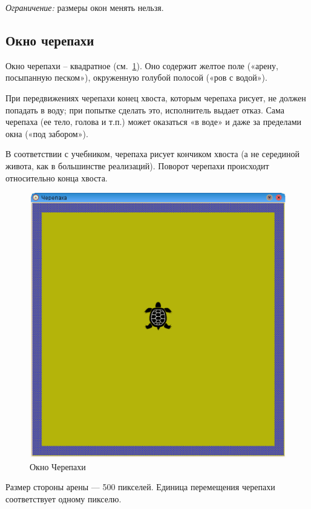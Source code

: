 \emph{Ограничение:} размеры окон менять нельзя.

\subsection{Окно черепахи}

Окно черепахи – квадратное (см.~\ref{tortWindow}). Оно содержит желтое поле («арену, посыпанную песком»), окруженную голубой полосой («ров с водой»).

При передвижениях черепахи конец хвоста, которым черепаха рисует, не должен попадать в воду; при попытке сделать это, исполнитель выдает отказ. Сама черепаха (ее тело, голова и т.п.) может оказаться «в воде» и даже за пределами окна («под забором»). 

В соответствии с учебником, черепаха рисует кончиком хвоста (а не серединой живота, как в большинстве реализаций). Поворот черепахи происходит относительно конца хвоста. 

\begin{figure}[h]
	\begin{center}
		\includegraphics[scale=0.5]{tortwindow.png}
	\end{center}
	\caption{Окно Черепахи}
\label{tortWindow}
\end{figure}

Размер стороны арены --- 500 пикселей. Единица перемещения черепахи соответствует одному пикселю.

